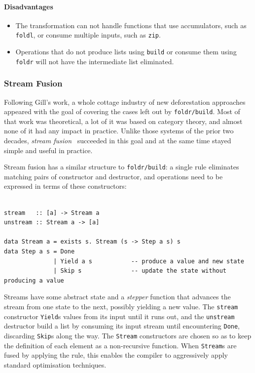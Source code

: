 \paragraph{Disadvantages}
\begin{itemize}
    \item The transformation can not handle functions that use accumulators,
        such as \texttt{foldl}, or consume multiple inputs, such as
        \texttt{zip}.

    \item Operations that do not produce lists using \texttt{build} or consume
        them using \texttt{foldr} will not have the intermediate list
        eliminated.
\end{itemize}


\subsubsection{Stream Fusion}

Following Gill's work, a whole cottage industry of new deforestation approaches
appeared with the goal of covering the cases left out by
\texttt{foldr/build}. Most of that work was
theoretical, a lot of it was based on category theory, and almost none of it had
any impact in practice. Unlike those systems of the prior two decades,
\emph{stream fusion}~\cite{Coutts:2007kp} succeeded in this
goal and at the same time stayed simple and useful in practice.

Stream fusion has a similar structure to \texttt{foldr/build}: a single rule
eliminates matching pairs of constructor and destructor, and operations need to
be expressed in terms of these constructors:
%
\begin{lstlisting}[style=Haskell,numbers=none,mathescape,caption={The \emph{stream fusion} transformation}]
%\bf$\langle$ stream fusion $\rangle$% forall s. stream (unstream s) $\mapsto$ s

stream   :: [a] -> Stream a
unstream :: Stream a -> [a]

data Stream a = exists s. Stream (s -> Step a s) s
data Step a s = Done
              | Yield a s           -- produce a value and new state
              | Skip s              -- update the state without producing a value
\end{lstlisting}

Streams have some abstract state and a \emph{stepper} function that advances the
stream from one state to the next, possibly yielding a new value. The
\texttt{stream} constructor \texttt{Yield}s values from its input until it runs
out, and the \texttt{unstream} destructor build a list by consuming its input
stream until encountering \texttt{Done}, discarding \texttt{Skip}s along the
way. The \texttt{Stream} constructors are chosen so as to keep the definition of
each element as a non-recursive function. When \texttt{Stream}s are fused by
applying the rule, this enables the compiler to aggressively apply standard
optimisation techniques.

